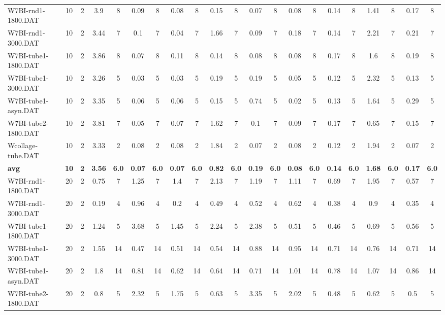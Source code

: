 \begin{sidewaystable}[!ht]
{\begin{tabular}{lcccccccccccccccccccc}
W7BI-rnd1-1800.DAT & 10 & 2 & 3.9 & 8 & 0.09 & 8 & 0.08 & 8 & 0.15 & 8 & 0.07 & 8 & 0.08 & 8 & 0.14 & 8 & 1.41 & 8 & 0.17 & 8 \\
W7BI-rnd1-3000.DAT & 10 & 2 & 3.44 & 7 & 0.1 & 7 & 0.04 & 7 & 1.66 & 7 & 0.09 & 7 & 0.18 & 7 & 0.14 & 7 & 2.21 & 7 & 0.21 & 7 \\
W7BI-tube1-1800.DAT & 10 & 2 & 3.86 & 8 & 0.07 & 8 & 0.11 & 8 & 0.14 & 8 & 0.08 & 8 & 0.08 & 8 & 0.17 & 8 & 1.6 & 8 & 0.19 & 8 \\
W7BI-tube1-3000.DAT & 10 & 2 & 3.26 & 5 & 0.03 & 5 & 0.03 & 5 & 0.19 & 5 & 0.19 & 5 & 0.05 & 5 & 0.12 & 5 & 2.32 & 5 & 0.13 & 5 \\
W7BI-tube1-asyn.DAT & 10 & 2 & 3.35 & 5 & 0.06 & 5 & 0.06 & 5 & 0.15 & 5 & 0.74 & 5 & 0.02 & 5 & 0.13 & 5 & 1.64 & 5 & 0.29 & 5 \\
W7BI-tube2-1800.DAT & 10 & 2 & 3.81 & 7 & 0.05 & 7 & 0.07 & 7 & 1.62 & 7 & 0.1 & 7 & 0.09 & 7 & 0.17 & 7 & 0.65 & 7 & 0.15 & 7 \\
Wcollage-tube.DAT & 10 & 2 & 3.33 & 2 & 0.08 & 2 & 0.08 & 2 & 1.84 & 2 & 0.07 & 2 & 0.08 & 2 & 0.12 & 2 & 1.94 & 2 & 0.07 & 2 \\
\cline{1-21} \textbf{avg} & \textbf{10} & \textbf{2} & \textbf{3.56} & \textbf{6.0} & \textbf{0.07} & \textbf{6.0} & \textbf{0.07} & \textbf{6.0} & \textbf{0.82} & \textbf{6.0} & \textbf{0.19} & \textbf{6.0} & \textbf{0.08} & \textbf{6.0} & \textbf{0.14} & \textbf{6.0} & \textbf{1.68} & \textbf{6.0} & \textbf{0.17} & \textbf{6.0} \\ \cline{1-21}
W7BI-rnd1-1800.DAT & 20 & 2 & 0.75 & 7 & 1.25 & 7 & 1.4 & 7 & 2.13 & 7 & 1.19 & 7 & 1.11 & 7 & 0.69 & 7 & 1.95 & 7 & 0.57 & 7 \\
W7BI-rnd1-3000.DAT & 20 & 2 & 0.19 & 4 & 0.96 & 4 & 0.2 & 4 & 0.49 & 4 & 0.52 & 4 & 0.62 & 4 & 0.38 & 4 & 0.9 & 4 & 0.35 & 4 \\
W7BI-tube1-1800.DAT & 20 & 2 & 1.24 & 5 & 3.68 & 5 & 1.45 & 5 & 2.24 & 5 & 2.38 & 5 & 0.51 & 5 & 0.46 & 5 & 0.69 & 5 & 0.56 & 5 \\
W7BI-tube1-3000.DAT & 20 & 2 & 1.55 & 14 & 0.47 & 14 & 0.51 & 14 & 0.54 & 14 & 0.88 & 14 & 0.95 & 14 & 0.71 & 14 & 0.76 & 14 & 0.71 & 14 \\
W7BI-tube1-asyn.DAT & 20 & 2 & 1.8 & 14 & 0.81 & 14 & 0.62 & 14 & 0.64 & 14 & 0.71 & 14 & 1.01 & 14 & 0.78 & 14 & 1.07 & 14 & 0.86 & 14 \\
W7BI-tube2-1800.DAT & 20 & 2 & 0.8 & 5 & 2.32 & 5 & 1.75 & 5 & 0.63 & 5 & 3.35 & 5 & 2.02 & 5 & 0.48 & 5 & 0.62 & 5 & 0.5 & 5 \\

\end{tabular}}
\end{sidewaystable}
